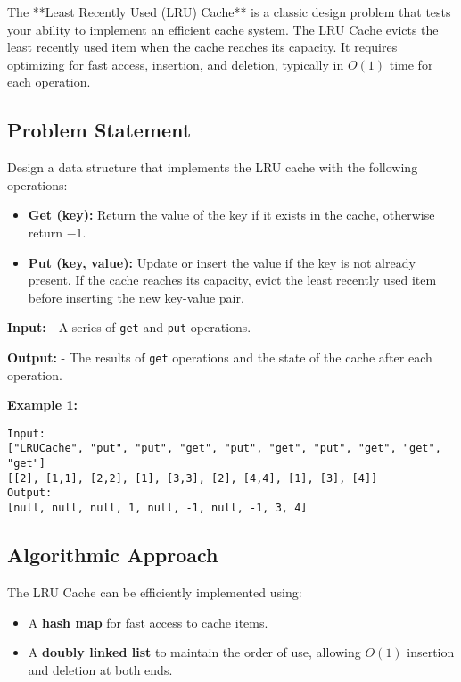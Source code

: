 
\label{problem:LRU_Cache}

The **Least Recently Used (LRU) Cache** is a classic design problem that tests your ability to implement an efficient cache system. The LRU Cache evicts the least recently used item when the cache reaches its capacity. It requires optimizing for fast access, insertion, and deletion, typically in \(O(1)\) time for each operation.

\subsection*{Problem Statement}
Design a data structure that implements the LRU cache with the following operations:
\begin{itemize}
    \item \textbf{Get (key):} Return the value of the key if it exists in the cache, otherwise return \(-1\).
    \item \textbf{Put (key, value):} Update or insert the value if the key is not already present. If the cache reaches its capacity, evict the least recently used item before inserting the new key-value pair.
\end{itemize}

\textbf{Input:}
- A series of \texttt{get} and \texttt{put} operations.

\textbf{Output:}
- The results of \texttt{get} operations and the state of the cache after each operation.

\textbf{Example 1:}
\begin{verbatim}
Input:
["LRUCache", "put", "put", "get", "put", "get", "put", "get", "get", "get"]
[[2], [1,1], [2,2], [1], [3,3], [2], [4,4], [1], [3], [4]]
Output:
[null, null, null, 1, null, -1, null, -1, 3, 4]
\end{verbatim}

\subsection*{Algorithmic Approach}
The LRU Cache can be efficiently implemented using:
\begin{itemize}
    \item A \textbf{hash map} for fast access to cache items.
    \item A \textbf{doubly linked list} to maintain the order of use, allowing \(O(1)\) insertion and deletion at both ends.
\end{itemize}


